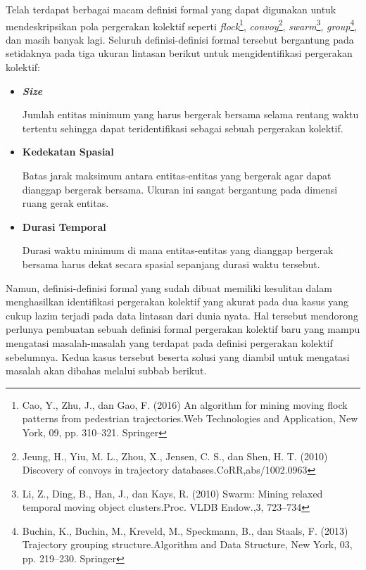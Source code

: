 \documentclass[a4paper,twoside]{article}
\begin{document}
Telah terdapat berbagai macam definisi formal yang dapat digunakan untuk mendeskripsikan pola pergerakan kolektif seperti \textit{flock}\footnote{Cao, Y., Zhu, J., dan Gao, F. (2016) An algorithm for mining moving flock patterns from pedestrian trajectories.Web Technologies and Application, New York, 09, pp. 310–321. Springer}, \textit{convoy}\footnote{Jeung, H., Yiu, M. L., Zhou, X., Jensen, C. S., dan Shen, H. T. (2010) Discovery of convoys in trajectory databases.CoRR,abs/1002.0963}, \textit{swarm}\footnote{Li, Z., Ding, B., Han, J., dan Kays, R. (2010) Swarm: Mining relaxed temporal moving object clusters.Proc. VLDB Endow.,3, 723–734}, \textit{group}\footnote{Buchin, K., Buchin, M., Kreveld, M., Speckmann, B., dan Staals, F. (2013) Trajectory grouping structure.Algorithm and Data Structure, New York, 03, pp. 219–230. Springer}, dan masih banyak lagi. Seluruh definisi-definisi formal tersebut bergantung pada setidaknya pada tiga ukuran lintasan berikut untuk mengidentifikasi pergerakan kolektif:

\begin{itemize}[noitemsep, nolistsep]
    \item \textbf{\textit{Size}}
    
    Jumlah entitas minimum yang harus bergerak bersama selama rentang waktu tertentu sehingga dapat teridentifikasi sebagai sebuah pergerakan kolektif.
    
    \item \textbf{Kedekatan Spasial}
    
    Batas jarak maksimum antara entitas-entitas yang bergerak agar dapat dianggap bergerak bersama. Ukuran ini sangat bergantung pada dimensi ruang gerak entitas.
    
    \item \textbf{Durasi Temporal}
    
    Durasi waktu minimum di mana entitas-entitas yang dianggap bergerak bersama harus dekat secara spasial sepanjang durasi waktu tersebut. 
\end{itemize}

Namun, definisi-definisi formal yang sudah dibuat memiliki
kesulitan dalam menghasilkan identifikasi pergerakan kolektif yang akurat pada dua kasus yang cukup lazim terjadi pada data lintasan dari dunia nyata. Hal tersebut mendorong perlunya pembuatan sebuah definisi formal pergerakan kolektif baru yang mampu mengatasi masalah-masalah yang terdapat pada definisi pergerakan kolektif sebelumnya. Kedua kasus tersebut beserta solusi yang diambil untuk mengatasi masalah akan dibahas melalui subbab berikut.
\end{document}

